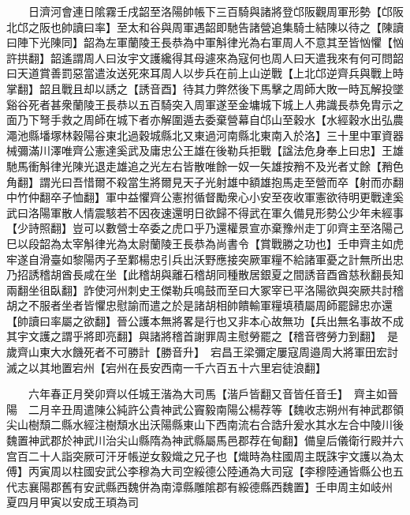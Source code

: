 　　日濟河會連日隂霧壬戌韶至洛陽帥帳下三百騎與諸將登邙阪觀周軍形勢【邙阪北邙之阪也帥讀曰率】至太和谷與周軍遇韶即馳告諸營追集騎士結陳以待之【陳讀曰陣下光陳同】韶為左軍蘭陵王長恭為中軍斛律光為右軍周人不意其至皆忷懼【忷許拱翻】韶遙謂周人曰汝宇文護纔得其母遽來為寇何也周人曰天遣我來有何可問韶曰天道賞善罰惡當遣汝送死來耳周人以步兵在前上山逆戰【上北邙逆齊兵與戰上時掌翻】韶且戰且却以誘之【誘音酉】待其力弊然後下馬擊之周師大敗一時瓦解投墜谿谷死者甚衆蘭陵王長恭以五百騎突入周軍遂至金墉城下城上人弗識長恭免胄示之面乃下弩手救之周師在城下者亦解圍遁去委棄營幕自邙山至穀水【水經穀水出弘農澠池縣墦塚林穀陽谷東北過穀城縣北又東過河南縣北東南入於洛】三十里中軍資器械彌滿川澤唯齊公憲達奚武及庸忠公王雄在後勒兵拒戰【諡法危身奉上曰忠】王雄馳馬衝斛律光陳光退走雄追之光左右皆散唯餘一奴一矢雄按矟不及光者丈餘【矟色角翻】謂光曰吾惜爾不殺當生將爾見天子光射雄中額雄抱馬走至營而卒【射而亦翻中竹仲翻卒子恤翻】軍中益懼齊公憲拊循督勵衆心小安至夜收軍憲欲待明更戰達奚武曰洛陽軍散人情震駭若不因夜速還明日欲歸不得武在軍久備見形勢公少年未經事【少詩照翻】豈可以數營士卒委之虎口乎乃還權景宣亦棄豫州走丁卯齊主至洛陽己巳以段韶為太宰斛律光為太尉蘭陵王長恭為尚書令【賞戰勝之功也】壬申齊主如虎牢遂自滑臺如黎陽丙子至鄴楊忠引兵出沃野應接突厥軍糧不給諸軍憂之計無所出忠乃招誘稽胡酋長咸在坐【此稽胡與離石稽胡同種散居銀夏之間誘音酉酋慈秋翻長知兩翻坐徂臥翻】詐使河州刺史王傑勒兵鳴鼓而至曰大冢宰已平洛陽欲與突厥共討稽胡之不服者坐者皆懼忠慰諭而遣之於是諸胡相帥饋輸軍糧填積屬周師罷歸忠亦還【帥讀曰率屬之欲翻】晉公護本無將畧是行也又非本心故無功【兵出無名事故不成其宇文護之謂乎將即亮翻】與諸將稽首謝罪周主慰勞罷之【稽音啓勞力到翻】　是歲齊山東大水饑死者不可勝計【勝音升】　宕昌王梁彌定屢寇周邉周大將軍田宏討滅之以其地置宕州【宕州在長安西南一千六百五十六里宕徒浪翻】

　　六年春正月癸卯齊以任城王湝為大司馬【湝戶皆翻又音皆任音壬】　齊主如晉陽　二月辛丑周遣陳公純許公貴神武公竇毅南陽公楊荐等【魏收志朔州有神武郡領尖山樹頹二縣水經注樹頹水出沃陽縣東山下西南流右合誥升爰水其水左合中陵川後魏置神武郡於神武川治尖山縣隋為神武縣屬馬邑郡荐在甸翻】備皇后儀衛行殿并六宫百二十人詣突厥可汗牙帳逆女毅熾之兄子也【熾時為柱國周主既誅宇文護以為太傅】丙寅周以柱國安武公李穆為大司空綏德公陸通為大司寇【李穆陸通皆縣公也五代志襄陽郡舊有安武縣西魏併為南漳縣雕隂郡有綏德縣西魏置】壬申周主如岐州　夏四月甲寅以安成王頊為司

